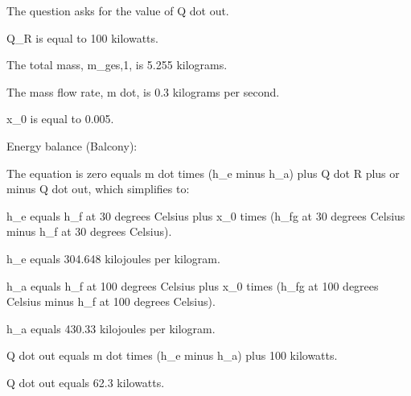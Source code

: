 The question asks for the value of Q dot out.

Q_R is equal to 100 kilowatts.

The total mass, m_ges,1, is 5.255 kilograms.

The mass flow rate, m dot, is 0.3 kilograms per second.

x_0 is equal to 0.005.

Energy balance (Balcony):

The equation is zero equals m dot times (h_e minus h_a) plus Q dot R plus or minus Q dot out, which simplifies to:

h_e equals h_f at 30 degrees Celsius plus x_0 times (h_fg at 30 degrees Celsius minus h_f at 30 degrees Celsius).

h_e equals 304.648 kilojoules per kilogram.

h_a equals h_f at 100 degrees Celsius plus x_0 times (h_fg at 100 degrees Celsius minus h_f at 100 degrees Celsius).

h_a equals 430.33 kilojoules per kilogram.

Q dot out equals m dot times (h_e minus h_a) plus 100 kilowatts.

Q dot out equals 62.3 kilowatts.